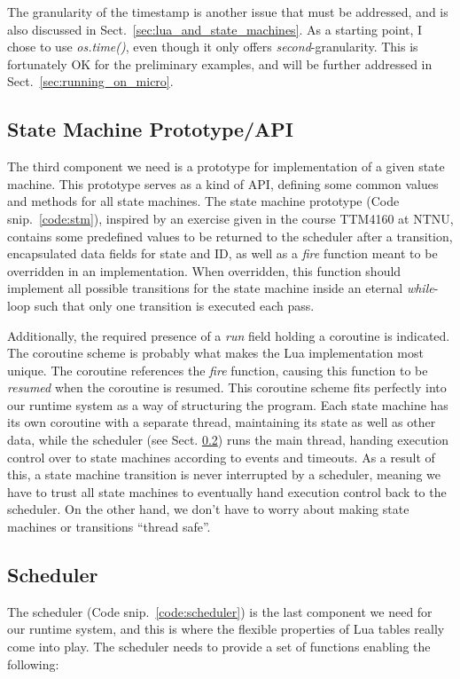 The granularity of the timestamp is another issue that must be addressed, and is also discussed in Sect.~\ref{sec:lua_and_state_machines}. As a starting point, I chose to use \emph{os.time()}, even though it only offers \emph{second}-granularity. This is fortunately OK for the preliminary examples, and will be further addressed in Sect.~\ref{sec:running_on_micro}.

\subsection{State Machine Prototype/API}
\label{sec:impl_stm}
The third component we need is a prototype for implementation of a given state machine. This prototype serves as a kind of API, defining some common values and methods for all state machines. The state machine prototype (Code snip.~\ref{code:stm}), inspired by an exercise given in the course TTM4160 at NTNU, contains some predefined values to be returned to the scheduler after a transition, encapsulated data fields for state and ID, as well as a \emph{fire} function meant to be overridden in an implementation. When overridden, this function should implement all possible transitions for the state machine inside an eternal \emph{while}-loop such that only one transition is executed each pass.

Additionally, the required presence of a \emph{run} field holding a coroutine is indicated. The coroutine scheme is probably what makes the Lua implementation most unique. The coroutine references the \emph{fire} function, causing this function to be \emph{resumed} when the coroutine is resumed. This coroutine scheme fits perfectly into our runtime system as a way of structuring the program. Each state machine has its own coroutine with a separate thread, maintaining its state as well as other data, while the scheduler (see Sect. \ref{sec:impl_sched}) runs the main thread, handing execution control over to state machines according to events and timeouts. As a result of this, a state machine transition is never interrupted by a scheduler, meaning we have to trust all state machines to eventually hand execution control back to the scheduler. On the other hand, we don't have to worry about making state machines or transitions ``thread safe''.

\subsection{Scheduler}
\label{sec:impl_sched}
The scheduler (Code snip.~\ref{code:scheduler}) is the last component we need for our runtime system, and this is where the flexible properties of Lua tables really come into play. The scheduler needs to provide a set of functions enabling the following:


